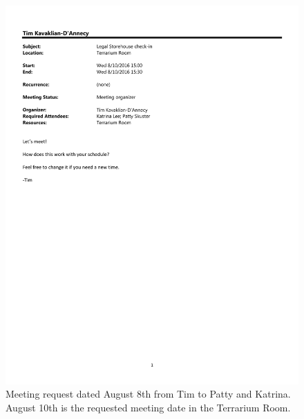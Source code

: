 \begin{figure}
  \centering
        \noindent\includegraphics[page=1,angle=-90,origin=c,width=.75\textwidth,height=.75\textheight]{documents/2016-08-08-Meeting-Tim-Patty-Katrina}
 \caption{Meeting request dated August 8th from Tim to Patty and Katrina. August 10th is the requested meeting date in the Terrarium Room.}
 \label{fig:2016-08-08-Meeting-Tim-Patty-Katrina}
\end{figure}